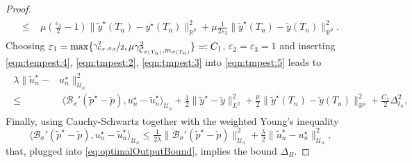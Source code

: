 \documentclass[reqno]{amsart}
\newcommand{\U}{{\mathscr U}}
\newcommand{\R}{\mathbb R}
\newcommand{\adState}{p}
\newcommand{\inpVar}{u}
\newcommand{\outVar}{y}
\newcommand{\outVarDim}{p}
\newcommand{\bOper}{\calB}
\newcommand{\cOper}{\calC}
\newcommand{\initBound}{\initBoundn{n}}%
\newcommand{\initBoundn}[1]{\Delta_{t_{#1}}}
\newcommand{\optInpVar}[1]{\inpVar_{#1}^\star}
\newcommand{\optInpVarN}{\optInpVar{n}}
\newcommand{\optOutVar}{\outVar^\star}
\newcommand{\switch}{\sigma}
\newcommand{\reduce}[1]{\tilde{#1}}
\newcommand{\BoundControlB}{\Delta_{B}}
\newcommand{\adStateRed}{\reduce{\adState}}
\newcommand{\outVarRed}{\reduce{\outVar}}
\newcommand{\optAdStateRed}{\adStateRed^\star}
\newcommand{\optInpVarRed}[1]{\reduce{\inpVar}_{#1}^\star}
\newcommand{\optInpVarRedN}{\optInpVarRed{n}}
\newcommand{\optOutVarRed}{\outVarRed^\star}
\newcommand{\intermediateAdStateB}{\check{\adState}}
\newcommand{\intermediateOutVar}{\check{\outVar}}
\newcommand{\calB}{\mathcal{B}}
\newcommand{\calC}{\mathcal{C}}
\begin{document}
\begin{proof}
\begin{align}
\begin{aligned}
     \leq&\; \mu\left(\tfrac{\varepsilon_3}{2}-1\right)\|\optOutVarRed(T_n) - \optOutVar(T_n)\|_{\R^{\outVarDim}}^2 + \mu\tfrac{1}{2\varepsilon_3}\|\optOutVarRed(T_n) - \intermediateOutVar(T_n)\|_{\R^{\outVarDim}}^2.
  \end{aligned}
	\end{align}
    Choosing 
    $ \varepsilon_1=\max\{\nicefrac{\gamma^2_{\cOper_{\switch},{a}_{\switch}}}{2},\mu \gamma^2_{\cOper_{\sigma(T_n)},m_{\switch(T_n)}}\}\eqqcolon C_1$, $\varepsilon_2=\varepsilon_3=1$ and inserting \eqref{eqn:tempest:4}, \eqref{eqn:tmpest:2}, \eqref{eqn:tmpest:3}  into \eqref{eqn:tmpest:5} leads to
	\begin{align}\label{eq:optimalOutputBound}
 \begin{aligned}
		\lambda \|\optInpVarRedN -& \optInpVarN\|^2_{\U_n} 
		 \\
   \leq &\;  \langle \bOper_{\switch}'(\optAdStateRed-\intermediateAdStateB), \optInpVarN-\optInpVarRedN \rangle_{\U_n}  +\tfrac{1}{2} \|\optOutVarRed - \intermediateOutVar\|_{L^2}^2  + \tfrac{\mu}{2}\|\optOutVarRed(T_n) - \intermediateOutVar(T_n)\|_{\R^{\outVarDim}}^2
        +\tfrac{C_1}{2}\initBound^2, 
        \end{aligned}
	\end{align}
    Finally, using Cauchy-Schwartz together with the weighted Young's inequality
    \begin{equation*}
		\nonumber %
		\langle \bOper_{\switch}'(\optAdStateRed-\intermediateAdStateB), \optInpVarN-\optInpVarRedN \rangle_{\U_n} \leq \tfrac{1}{2\lambda} \|\bOper_{\switch}'(\optAdStateRed-\intermediateAdStateB)\|_{\U_n}^2 + \tfrac{\lambda}{2} \|\optInpVarRedN - \optInpVarN\|^2_{\U_n},
	\end{equation*}
    that, plugged into \eqref{eq:optimalOutputBound}, implies the bound $\BoundControlB$.


\end{proof}
\end{document}
